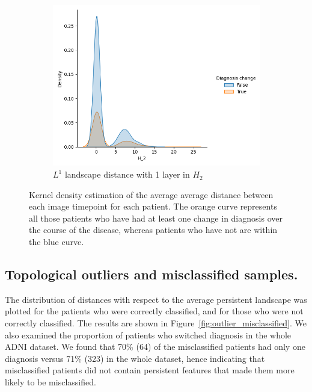 \documentclass{article}
\begin{document}
\begin{figure}
\begin{subfigure}{0.32\textwidth}
    \includegraphics[width=\textwidth]{figures/temporal_evolution/landscape_H_2_dist_diag_change.png}
    \caption{$L^{1}$ landscape distance with 1 layer in $H_2$}
  \end{subfigure}
  \caption{Kernel density estimation of the average average distance between each image timepoint
    for each patient. The orange curve represents all those patients who have had at least one
    change in diagnosis over the course of the disease, whereas patients who have not are within the
    blue curve.}
  \label{fig:kde_intra_patient}
\end{figure}

\subsection{Topological outliers and misclassified samples.}

The distribution of distances with respect to the average persistent landscape was plotted for the
patients who were correctly classified, and for those who were not correctly classified. The results
are shown in Figure~\ref{fig:outlier_misclassified}. We also examined the proportion of patients who
switched diagnosis in the whole ADNI dataset. We found that 70\% (64) of the misclassified patients
had only one diagnosis versus 71\% (323) in the whole dataset, hence indicating that misclassified
patients did not contain persistent features that made them more likely to be misclassified.
\end{document}

